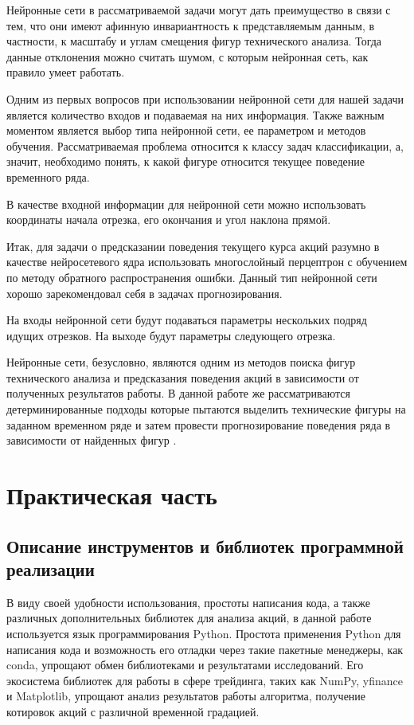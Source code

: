 \documentclass[bachelor, och, coursework]{SCWorks}
\begin{document}
        Нейронные сети в рассматриваемой задачи могут дать преимущество в связи
        с тем, что они имеют афинную инвариантность к представляемым данным, в
        частности, к масштабу и углам смещения фигур технического анализа. Тогда
        данные отклонения можно считать шумом, с которым нейронная сеть, как
        правило умеет работать. 

        Одним из первых вопросов при использовании нейронной сети для нашей
        задачи является количество входов и подаваемая на них информация. Также
        важным моментом является выбор типа нейронной сети, ее параметром и
        методов обучения. Рассматриваемая проблема относится к классу задач
        классификации, а, значит, необходимо понять, к какой фигуре относится
        текущее поведение временного ряда.

        В качестве входной информации для нейронной сети можно использовать
        координаты начала отрезка, его окончания и угол наклона прямой. 

        Итак, для задачи о предсказании поведения текущего курса акций разумно в
        качестве нейросетевого ядра использовать многослойный перцептрон с
        обучением по методу обратного распространения ошибки. Данный тип
        нейронной сети хорошо зарекомендовал себя в задачах прогнозирования.

        На входы нейронной сети будут подаваться параметры нескольких подряд
        идущих отрезков. На выходе будут параметры следующего отрезка.
        
        Нейронные сети, безусловно, являются одним из методов поиска фигур
        технического анализа и предсказания поведения акций в зависимости от
        полученных результатов работы. В данной работе же рассматриваются
        детерминированные подходы которые пытаются выделить технические фигуры
        на заданном временном ряде и затем провести прогнозирование поведения
        ряда в зависимости от найденных фигур \cite{SHUMKOV}.


\section{Практическая часть}

    \subsection{Описание инструментов и библиотек программной реализации}

        В виду своей удобности использования, простоты написания кода, а также
        различных дополнительных библиотек для анализа акций, в данной работе
        используется язык программирования Python. Простота применения Python
        для написания кода и возможность его отладки через такие пакетные
        менеджеры, как conda, упрощают обмен библиотеками и результатами
        исследований. Его экосистема библиотек для работы в сфере трейдинга,
        таких как NumPy, yfinance и Matplotlib, упрощают анализ результатов
        работы алгоритма, получение котировок акций с различной временной
        градацией.
\end{document}
